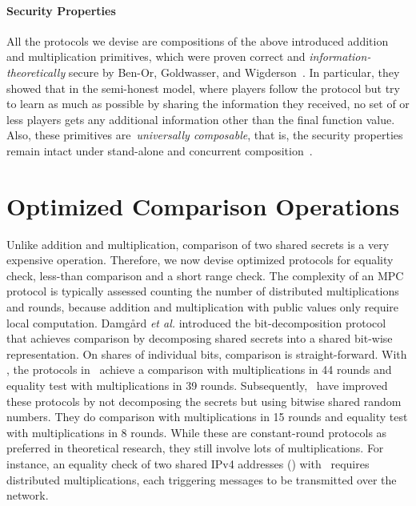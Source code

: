 \documentclass[letterpaper,11pt,onecolumn,titlepage]{article}
\begin{document}
\paragraph{Security Properties} 
All the protocols we devise are compositions of the above introduced
addition and multiplication primitives, which were proven correct and
\emph{information-theoretically} secure by Ben-Or, Goldwasser, and
Wigderson~\cite{benor1988ctn}. In particular, they showed that in the
semi-honest model, where players follow the protocol but try to learn
as much as possible by sharing the information they received, no set
of  or less players gets any additional information other than the
final function value.  Also, these primitives are~\emph{universally
composable}, that is, the security properties remain intact under
stand-alone and concurrent composition~\cite{canetti2001universally}.






\section{Optimized Comparison Operations} 
\label{sec:comparisons}
Unlike addition and multiplication, comparison of two shared secrets is a very expensive operation. Therefore, we now devise optimized protocols for
equality check, less-than comparison and a short range check. 
The complexity of an MPC protocol is typically assessed counting the number of distributed multiplications and rounds, because addition and multiplication with public values only require local computation. 
Damg{\aa}rd \emph{et al.} introduced the bit-decomposition protocol~\cite{damgard2006bitdecomp} 
that achieves comparison by decomposing shared secrets into a shared bit-wise representation. On shares
of individual bits, comparison is straight-forward. With \mbox{}, the protocols in~\cite{damgard2006bitdecomp} achieve a comparison with  multiplications in 44 rounds and equality test with  multiplications in 39 rounds. 
Subsequently,~\cite{nishide2007nobitdecomp} have improved these protocols by not decomposing the secrets but using bitwise shared random numbers. They 
do comparison with  multiplications in 15 rounds and equality test with  multiplications in 8 rounds.
While these are constant-round protocols as preferred in theoretical research, they still involve lots of multiplications. For instance, an equality check of two shared IPv4 addresses () with~\cite{nishide2007nobitdecomp} requires  distributed multiplications, each triggering  messages to be transmitted over the network.
\end{document}
